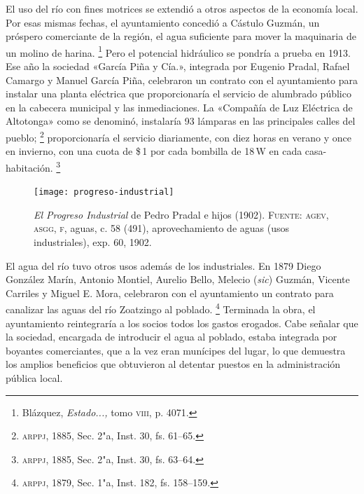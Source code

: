 \documentclass[14pt,twoside,final]{extbook} %
\let\oldfootnote\footnote
\renewcommand\footnote[1]{%
\oldfootnote{\hspace{1mm}#1}}
\begin{document}
El uso del río con fines motrices se extendió a otros aspectos de la economía local. Por esas mismas fechas, el ayuntamiento concedió a Cástulo Guzmán, un próspero comerciante de la región, el agua suficiente para mover la maquinaria de un molino de harina.\footnote{Blázquez, \emph{Estado...,} tomo \textsc{viii}, p. 4071.} Pero el potencial hidráulico se pondría a prueba en 1913. Ese año la sociedad «García Piña y Cía.», integrada por Eugenio Pradal, Rafael Camargo y Manuel García Piña, celebraron un contrato con el ayuntamiento para instalar una planta eléctrica que proporcionaría el servicio de alumbrado público en la cabecera municipal y las inmediaciones. La «Compañía de Luz Eléctrica de Altotonga» como se denominó, instalaría 93 lámparas en las principales calles del pueblo;\footnote{\textsc{arppj}, 1885, Sec. 2"a, Inst. 30, fs. 61--65.} proporcionaría el servicio diariamente, con diez horas en verano y once en invierno, con una cuota de \$\,1 por cada bombilla de 18\,W en cada casa-habitación.\footnote{\textsc{arppj}, 1885, Sec. 2"a, Inst. 30, fs. 63--64.}
\begin{figure}
\centering
\texttt{[image: progreso-industrial]}
\caption[\emph{El Progreso Industrial} de Pedro Pradal e hijos (1902)]{\emph{El Progreso Industrial} de Pedro Pradal e hijos (1902). \textsc{Fuente:} \textsc{agev, asgg, f}, aguas, c. 58 (491), aprovechamiento de aguas (usos industriales), exp. 60, 1902.}
\label{fig:progreso-industrial}
\end{figure}

El agua del río tuvo otros usos además de los industriales. En 1879 Diego González Marín, Antonio Montiel, Aurelio Bello, Melecio (\emph{sic}) Guzmán, Vicente Carriles y Miguel E. Mora, celebraron con el ayuntamiento un contrato para canalizar las aguas del río Zoatzingo al poblado.\footnote{\textsc{arppj}, 1879, Sec. 1"a, Inst. 182, fs. 158--159.} Terminada la obra, el ayuntamiento reintegraría a los socios todos los gastos erogados. Cabe señalar que la sociedad, encargada de introducir el agua al poblado, estaba integrada por boyantes comerciantes, que a la vez eran munícipes del lugar, lo que demuestra los amplios beneficios que obtuvieron al detentar puestos en la administración pública local.
\end{document}
